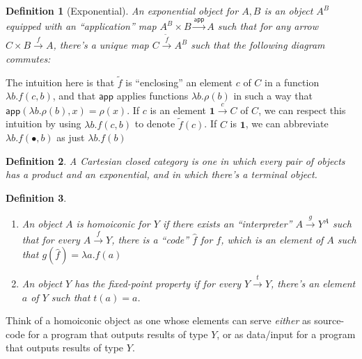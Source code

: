 \documentclass{article}
\newtheorem{definition}{Definition}
\DeclareMathOperator{\Id}{Id}
\begin{document}
\begin{definition}[Exponential]
  An exponential object for $A,B$ is an object $A^B$ equipped with an
  ``application'' map $A^B\times B \xrightarrow{\mathsf{app}} A$ such that for
  any arrow $C\times B \xrightarrow{f} A$, there's a unique map $C\xrightarrow{\tilde{f}}A^B$ such
  that the following diagram commutes:
  \begin{center}
  \end{center}
\end{definition}
The intuition here is that $\tilde{f}$ is ``enclosing'' an element $c$ of $C$ in
a function $\lambda b.f(c,b)$, and that $\mathsf{app}$ applies functions
$\lambda b. \rho(b)$ in such a way that $\mathsf{app}(\lambda b.\rho(b), x)
= \rho(x)$. If $c$ is an element $\mathbf{1}\xrightarrow{c} C$ of $C$, we can
respect this intuition by using $\lambda b.f(c,b)$ to denote $\tilde{f}(c)$. If
$C$ is $\mathbf{1}$, we can abbreviate $\lambda b.f(\bullet,b)$ as just
$\lambda b. f(b)$
\begin{definition} A Cartesian closed category is one in which every pair of
  objects has a product and an exponential, and in which there's a terminal
  object.
\end{definition}

\begin{definition}\
  \begin{enumerate}
    \item An object $A$ is homoiconic for $Y$ if there exists an
      ``interpreter'' $A\xrightarrow{g}Y^A$ such that for every $A\xrightarrow{f} Y$,
      there is a ``code'' $\hat{f}$ for $f$, which is an element of $A$ such that
      $g(\hat{f}) = \lambda a . f(a)$
    \item An object $Y$ has the fixed-point property if for every
      $Y\xrightarrow{t} Y$, there's an element $a$ of $Y$ such that $t(a) = a$.
  \end{enumerate}
\end{definition}

Think of a homoiconic object as one whose elements can serve \emph{either} as
source-code for a program that outputs results of type $Y$, or as data/input for
a program that outputs results of type $Y$.
\end{document}
